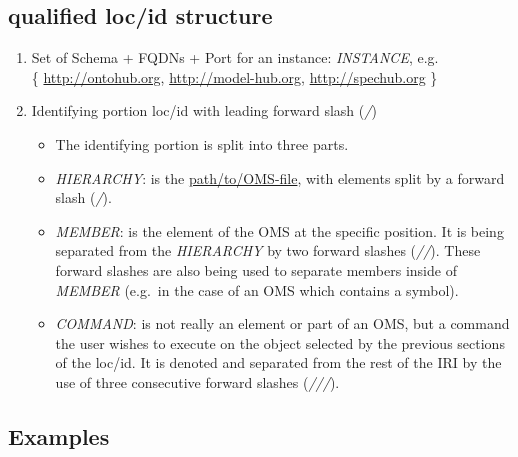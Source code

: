 \documentclass[10pt,fleqn,%
\ifpretendfinal
final%
\else
draft%
\fi,
]{scrreprt}
\begin{document}
\subsection{qualified loc/id structure}

\begin{enumerate}
  \item Set of Schema + FQDNs + Port for an instance: \emph{INSTANCE}, e.g.\\
    \{ \url{http://ontohub.org}, \url{http://model-hub.org}, \url{http://spechub.org} \}
  \item Identifying portion loc/id with leading forward slash (\emph{/})
  \begin{itemize}
    \item The identifying portion is split into three parts.
    \item \emph{HIERARCHY}: is the \url{path/to/OMS-file}, with elements
      split by a forward slash (\emph{/}).
    \item \emph{MEMBER}: is the element of the OMS at the specific
      position. It is being separated from the \emph{HIERARCHY} by two
      forward slashes (\emph{//}). These forward slashes are also being used to
      separate members inside of \emph{MEMBER} (e.g.\ in the case of an
      OMS which contains a symbol).
    \item \emph{COMMAND}: is not really an element or part of an OMS,
      but a command the user wishes to execute on the object selected by the
      previous sections of the loc/id. It is denoted and separated from the
      rest of the IRI by the use of three consecutive forward slashes
      (\emph{///}).
  \end{itemize}
\end{enumerate}

\subsection{Examples}
\end{document}
